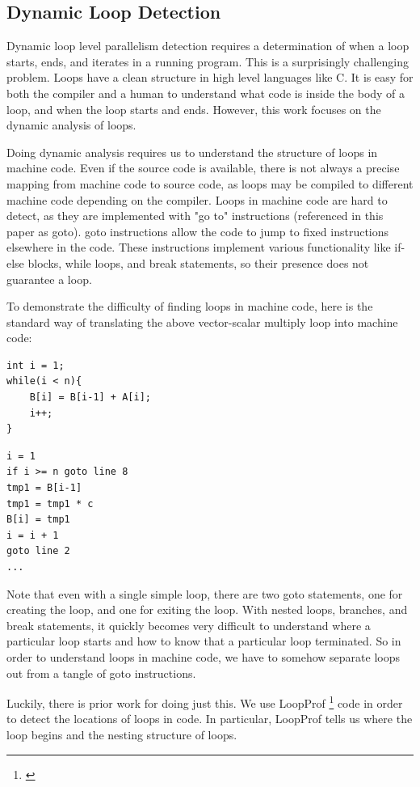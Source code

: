 \documentclass[12pt,twoside]{reedthesis}
\begin{document}
		\subsection{Dynamic Loop Detection}\label{s:loopprof-detection}
		
		Dynamic loop level parallelism detection requires a determination of when a loop starts, ends, and iterates in a running program.
		This is a surprisingly challenging problem. 
		Loops have a clean structure in high level languages like C. It is easy for both the compiler and a human to understand what code is inside the body of a loop, and when the loop starts and ends. However, this work focuses on the dynamic analysis of loops. 
		
		Doing dynamic analysis requires us to understand the structure of loops in machine code. Even if the source code is available, there is not always a precise mapping from machine code to source code, as loops may be compiled to different machine code depending on the compiler. Loops in machine code are hard to detect, as they are implemented with "go to" instructions (referenced in this paper as goto). goto instructions allow the code to jump to fixed instructions elsewhere in the code. These instructions implement various functionality like if-else blocks, while loops, and break statements, so their presence does not guarantee a loop.
		
		To demonstrate the difficulty of finding loops in machine code, here is the standard way of translating the above vector-scalar multiply loop into machine code:
		

		\begin{lstlisting}
int i = 1;
while(i < n){
	B[i] = B[i-1] + A[i];
	i++;
}
		\end{lstlisting}
		\begin{lstlisting}
i = 1
if i >= n goto line 8
tmp1 = B[i-1]
tmp1 = tmp1 * c
B[i] = tmp1
i = i + 1
goto line 2
...
		\end{lstlisting} 
		
		Note that even with a single simple loop, there are two goto statements, one for creating the loop, and one for exiting the loop. With nested loops, branches, and break statements, it quickly becomes very difficult to understand where a particular loop starts and how to know that a particular loop terminated.
		So in order to understand loops in machine code, we have to somehow separate loops out from a tangle of goto instructions. 
		
		Luckily, there is prior work for doing just this. We use LoopProf \footnote{\cite{Chen:2004}} code in order to detect the locations of loops in code. In particular, LoopProf tells us where the loop begins and the nesting structure of loops. 
		
\end{document}
